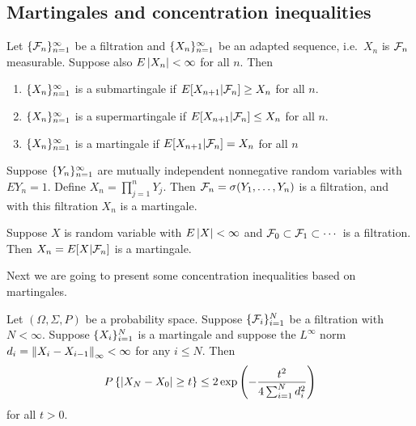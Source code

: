 \documentclass[a4paper]{article}
\begin{document}
\subsection{Martingales and concentration inequalities}

\begin{defi}
  Let $\{ \mathcal{F}_n \}_{n=1}^\infty$ be a filtration and $\{ X_n \}_{n=1}^\infty$ be
  an adapted sequence, i.e.\ $X_n$ is $\mathcal{F}_n$ measurable.
  Suppose also $E \left\lvert X_n\right\rvert < \infty$ for all $n$. Then
  \begin{enumerate}
    \item $\{ X_n \}_{n=1}^\infty$ is a submartingale if
          $E [X_{n + 1} | \mathcal{F}_n] \geq X_n$ for all $n$.
    \item $\{ X_n \}_{n=1}^\infty$ is a supermartingale if
          $E [X_{n + 1} | \mathcal{F}_n] \leq X_n$ for all $n$.
    \item $\{ X_n \}_{n=1}^\infty$ is a martingale if
          $E [X_{n + 1} | \mathcal{F}_n] = X_n$ for all $n$
  \end{enumerate}
\end{defi}

\begin{eg}
  Suppose $\{ Y_n \}_{n=1}^\infty$ are mutually independent nonnegative
  random variables with $E Y_n = 1$. Define $X_n = \prod_{j=1}^n Y_j$.
  Then $\mathcal{F}_n = \sigma (Y_1, \dots, Y_n)$ is a filtration,
  and with this filtration $X_n$ is a martingale.
\end{eg}

\begin{eg}
  Suppose $X$ is random variable with $E \left\lvert X\right\rvert < \infty$
  and $\mathcal{F}_0 \subset \mathcal{F}_1 \subset \cdots$ is a filtration.
  Then $X_n = E [X | \mathcal{F}_n]$ is a martingale.
\end{eg}

Next we are going to present some concentration inequalities
based on martingales.

\begin{thm}
  Let $(\Omega, \Sigma, P)$ be a probability space.
  Suppose $\{ \mathcal{F}_i \}_{i=1}^N$ be a filtration with $N < \infty$.
  Suppose $\{ X_i \}_{i=1}^N$ is a martingale
  and suppose the $L^\infty$ norm
  $d_i = \left\lVert X_i - X_{i - 1}\right\rVert_\infty < \infty$ for any $i \leq N$.
  Then
  \[
    P \left\{ \left\lvert X_N - X_0\right\rvert \geq t \right\}
    \leq 2 \exp \left( - \frac{t^2}{4 \sum_{i=1}^N d_i^2} \right)
  \]
  for all $t > 0$.
\end{thm}
\end{document}
